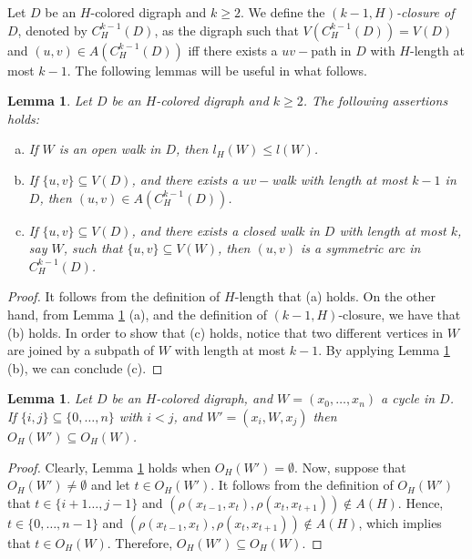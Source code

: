 \documentclass[10pt,a4paper]{article}
\newtheorem{lemma}[theorem]{Lemma}
\begin{document}
Let $D$ be an $H$-colored digraph and $k \geq 2$. We define the \textit{$(k-1,H)$-closure of $D$}, denoted by $C_{H}^{k-1}(D)$, as the digraph such that $V(C_{H}^{k-1}(D)) = V(D)$ and $(u,v) \in A(C_{H}^{k-1} (D))$ iff there exists a $uv-$path in $D$ with $H$-length at most $k-1$. The following lemmas will be useful in what follows.


\begin{lemma}
\label{walks}
Let $D$ be an $H$-colored digraph and $k \geq 2$. The following assertions holds:
	\begin{enumerate}[a)]
	\item If $W$ is an open walk in $D$, then $l_{H}(W) \leq l(W)$.
	
	\item If $\{u, v \} \subseteq V(D)$, and there exists a $uv-$walk with length at most $k-1$ in $D$, then $(u,v) \in A(C_{H}^{k-1} (D) )$. 
	
	\item If $\{u, v \} \subseteq V(D)$, and there exists a closed walk in $D$ with length at most $k$, say $W$, such that $\{u, v \} \subseteq V(W)$, then $(u,v)$ is a symmetric arc in $C_{H}^{k-1}(D)$.
	\end{enumerate}
\end{lemma}
\begin{proof}
It follows from the definition of $H$-length that (a) holds. On the other hand, from Lemma \ref{walks} (a), and  the definition of $(k-1,H)$-closure, we have that (b) holds. In order to show that (c) holds, notice that two different vertices in $W$ are joined by a subpath of $W$ with length at most $k-1$. By applying Lemma \ref{walks} (b), we can conclude (c).
\end{proof}

\begin{lemma}
\label{subpaths}
Let $D$ be an $H$-colored digraph, and $W=(x_{0}, \ldots , x_{n})$ a cycle in $D$. If $\{ i, j \} \subseteq \{ 0, \ldots , n \}$ with $i < j$, and $W'=(x_{i}, W , x_{j})$ then $O_{H}(W') \subseteq O_{H}(W)$. 
\end{lemma}
\begin{proof}
Clearly, Lemma \ref{subpaths} holds when $O_{H}(W') = \emptyset$. Now, suppose that $O_{H}(W') \neq \emptyset$ and let $t \in O_{H}(W')$. It follows from the definition of $O_{H}(W')$ that $t \in \{i+1 \ldots , j-1 \}$ and $(\rho (x_{t-1},  x_{t}) , \rho (x_{t}, x_{t+1})) \notin A(H)$. Hence, $t \in \{0, \ldots , n-1 \}$ and $(\rho (x_{t-1},  x_{t}) , \rho (x_{t}, x_{t+1})) \notin A(H)$, which implies that $t \in O_{H}(W)$. Therefore, $O_{H}(W') \subseteq O_{H}(W)$. 
\end{proof}
\end{document}
